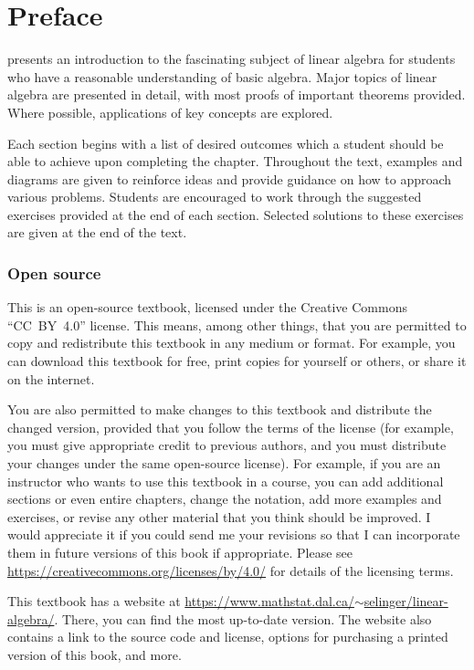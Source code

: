 \chapter*{Preface}

\textit{\bookfulltitle} presents an introduction to the fascinating
subject of linear algebra for students who have a reasonable
understanding of basic algebra. Major topics of linear algebra are
presented in detail, with most proofs of important theorems
provided. Where possible, applications of key concepts are explored.

Each section begins with a list of desired outcomes which a student
should be able to achieve upon completing the chapter.  Throughout the
text, examples and diagrams are given to reinforce ideas and provide
guidance on how to approach various problems. Students are encouraged
to work through the suggested exercises provided at the end of each
section. Selected solutions to these exercises are given at the end of
the text.

\subsection*{Open source}

This is an open-source textbook, licensed under the Creative Commons
``CC~BY~4.0'' license. This means, among other things, that you are
permitted to copy and redistribute this textbook in any medium or
format. For example, you can download this textbook for free, print
copies for yourself or others, or share it on the internet.

You are also permitted to make changes to this textbook and distribute
the changed version, provided that you follow the terms of the license
(for example, you must give appropriate credit to previous authors,
and you must distribute your changes under the same open-source
license). For example, if you are an instructor who wants to use this
textbook in a course, you can add additional sections or even entire
chapters, change the notation, add more examples and exercises, or
revise any other material that you think should be improved. I would
appreciate it if you could send me your revisions so that I can
incorporate them in future versions of this book if
appropriate. Please see
\href{https://creativecommons.org/licenses/by/4.0/}{https://creativecommons.org/licenses/by/4.0/}
for details of the licensing terms.

This textbook has a website at
\href{https://www.mathstat.dal.ca/~selinger/linear-algebra/}{https://www.mathstat.dal.ca/$\sim$selinger/linear-algebra/}.
There, you can find the most up-to-date version. The website
also contains a link to the source code and license, options for
purchasing a printed version of this book, and more.

